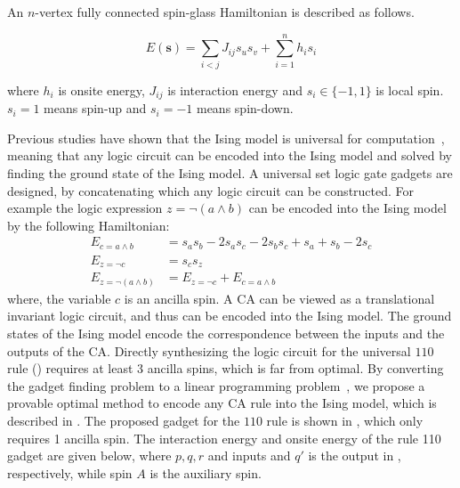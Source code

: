 \documentclass[twocolumn,superscriptaddress,english,showpacs,longbibliography]{revtex4-2}
\newcommand{\vs}{{\mathbf{s}}}
\begin{document}
An $n$-vertex fully connected spin-glass Hamiltonian is described as follows.

\begin{equation}
E(\vs) = \sum_{i < j} J_{ij}s_us_v + \sum_{i=1}^{n}h_i s_i
\end{equation}

where $h_i$ is onsite energy, $J_{ij}$ is interaction energy and
$s_i \in \{-1, 1\}$ is local spin. $s_i=1$ means spin-up and $s_i=-1$ means spin-down.

Previous studies have shown that the Ising model is universal for computation~\cite{Aadit2022, onizawa2020design, camsari2017stochastic}, meaning that any logic circuit can be encoded into the Ising model and solved by finding the ground state of the Ising model. A universal set logic gate gadgets are designed, by concatenating which any logic circuit can be constructed.
For example the logic expression $z = \neg (a \land b)$ can be encoded into the Ising model by the following Hamiltonian:
\begin{equation}
    \begin{split}
        E_{c = a \land b} &= s_a s_b -2 s_a s_c -2 s_bs_c + s_a + s_b -2 s_c\\
        E_{z = \neg c} &= s_c s_z\\
        E_{z = \neg (a \land b)} &= E_{z = \neg c} + E_{c = a \land b}
    \end{split}
\end{equation}
where, the variable $c$ is an ancilla spin.
A CA can be viewed as a translational invariant logic circuit, and thus can be encoded into the Ising model. The ground states of the Ising model encode the correspondence between the inputs and the outputs of the CA.
Directly synthesizing the logic circuit for the universal $110$ rule () requires at least 3 ancilla spins, which is far from optimal. By converting the gadget finding problem to a linear programming problem~\cite{Kolman1995}, we propose a provable optimal method to encode any CA rule into the Ising model, which is described in .
The proposed gadget for the $110$ rule is shown in , which only requires 1 ancilla spin.
The interaction energy and onsite energy of the rule 110 gadget are given below, where $p, q, r$ and inputs and $q'$ is the output in , respectively, while spin $A$ is the auxiliary spin.
\end{document}
